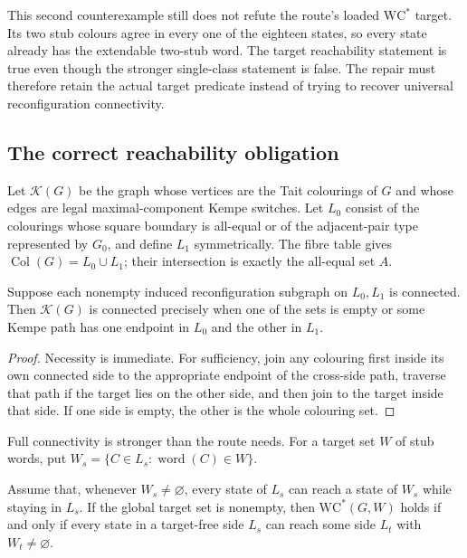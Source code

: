 This second counterexample still does not refute the route's loaded
\(\mathrm{WC}^{*}\) target.  Its two stub colours agree in every one of the
eighteen states, so every state already has the extendable two-stub word.
The target reachability statement is true even though the stronger
single-class statement is false.  The repair must therefore retain the
actual target predicate instead of trying to recover universal
reconfiguration connectivity.

\subsection{The correct reachability obligation}

Let \(\mathcal K(G)\) be the graph whose vertices are the Tait colourings of
\(G\) and whose edges are legal maximal-component Kempe switches.  Let
\(L_0\) consist of the colourings whose square boundary is all-equal or of
the adjacent-pair type represented by \(G_0\), and define \(L_1\)
symmetrically.  The fibre table gives
\(\operatorname{Col}(G)=L_0\cup L_1\); their intersection is exactly the
all-equal set \(A\).

\begin{lemma}
\label{lem:square-connected-union}
\Sprose
Suppose each nonempty induced reconfiguration subgraph on \(L_0,L_1\) is
connected.  Then \(\mathcal K(G)\) is connected precisely when one of the
sets is empty or some Kempe path has one endpoint in \(L_0\) and the other
in \(L_1\).
\end{lemma}

\begin{proof}
Necessity is immediate.  For sufficiency, join any colouring first inside
its own connected side to the appropriate endpoint of the cross-side path,
traverse that path if the target lies on the other side, and then join to
the target inside that side.  If one side is empty, the other is the whole
colouring set.
\end{proof}

Full connectivity is stronger than the route needs.  For a target set
\(W\) of stub words, put
\(W_s=\{C\in L_s:\operatorname{word}(C)\in W\}\).

\begin{lemma}
\label{lem:target-aware-square}
\Sprose
Assume that, whenever \(W_s\ne\varnothing\), every state of \(L_s\) can
reach a state of \(W_s\) while staying in \(L_s\).  If the global target set
is nonempty, then \(\mathrm{WC}^{*}(G,W)\) holds if and only if every state
in a target-free side \(L_s\) can reach some side \(L_t\) with
\(W_t\ne\varnothing\).
\end{lemma}

